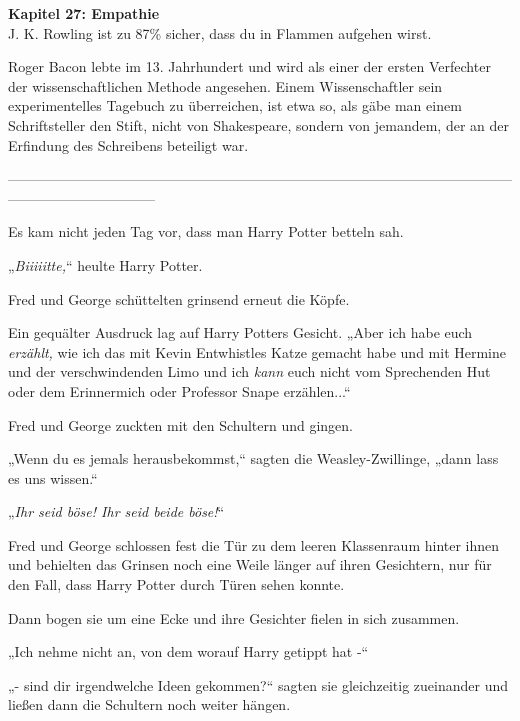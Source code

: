 

\hypertarget{empathie}{%

\textbf{Kapitel 27: Empathie}\\

\hfill\break J. K. Rowling ist zu 87\% sicher, dass du in Flammen aufgehen wirst.

Roger Bacon lebte im 13. Jahrhundert und wird als einer der ersten Verfechter der wissenschaftlichen Methode angesehen. Einem Wissenschaftler sein experimentelles Tagebuch zu überreichen, ist etwa so, als gäbe man einem Schriftsteller den Stift, nicht von Shakespeare, sondern von jemandem, der an der Erfindung des Schreibens beteiligt war.

--------------------------------------------------------------------------------------------------------------------------------------------

\hfill\break Es kam nicht jeden Tag vor, dass man Harry Potter betteln sah.

„\emph{Biiiiitte,}“ heulte Harry Potter.

Fred und George schüttelten grinsend erneut die Köpfe.

Ein gequälter Ausdruck lag auf Harry Potters Gesicht. „Aber ich habe euch \emph{erzählt,} wie ich das mit Kevin Entwhistles Katze gemacht habe und mit Hermine und der verschwindenden Limo und ich \emph{kann} euch nicht vom Sprechenden Hut oder dem Erinnermich oder Professor Snape erzählen...“

Fred und George zuckten mit den Schultern und gingen.

„Wenn du es jemals herausbekommst,“ sagten die Weasley-Zwillinge, „dann lass es uns wissen.“

„\emph{Ihr seid böse! Ihr seid beide böse!}“

Fred und George schlossen fest die Tür zu dem leeren Klassenraum hinter ihnen und behielten das Grinsen noch eine Weile länger auf ihren Gesichtern, nur für den Fall, dass Harry Potter durch Türen sehen konnte.

Dann bogen sie um eine Ecke und ihre Gesichter fielen in sich zusammen.

„Ich nehme nicht an, von dem worauf Harry getippt hat -“

„- sind dir irgendwelche Ideen gekommen?“ sagten sie gleichzeitig zueinander und ließen dann die Schultern noch weiter hängen.

}

